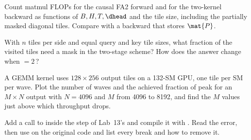 \begin{exercise}
Count matmul FLOPs for the causal FA2 forward and for the two-kernel backward as functions of
$B,H,T,\dhead$ and the tile size, including the partially masked diagonal tiles. Compare with a
backward that stores $\mat{P}$.
\end{exercise}

\begin{exercise}
With $n$ tiles per side and equal query and key tile sizes, what fraction of the visited tiles need a
mask in the two-stage scheme? How does the answer change when $=2\,$?
\end{exercise}

\begin{exercise}\label{ex:perf:waves}
A GEMM kernel uses $128\times256$ output tiles on a 132-SM GPU, one tile per SM per wave. Plot the
number of waves and the achieved fraction of peak for an $M\times N$ output with $N=4096$ and
$M$ from 4096 to 8192, and find the $M$ values just above which throughput drops.
\end{exercise}

\begin{exercise}
Add a call to  inside the step of Lab~13's  and
compile it with . Read the error, then use  on the
original code and list every break and how to remove it.
\end{exercise}

